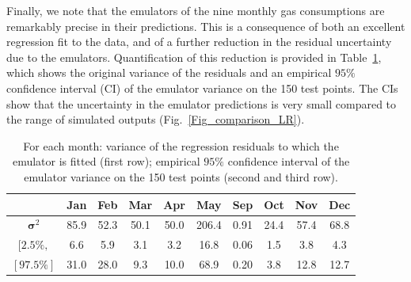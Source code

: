 \documentclass[preprint,12pt, sort&compress]{elsarticle}
\newcommand{\bd}[1]{\boldsymbol{#1}}
\begin{document}
Finally, we note that the emulators of the nine monthly gas consumptions are remarkably precise in their predictions. This is a consequence of both an excellent regression fit to the data, and of a further reduction in the residual uncertainty due to the emulators. Quantification of this reduction is provided in Table~\ref{Table_variance}, which shows the original variance of the residuals and an empirical $95\%$ confidence interval (CI) of the emulator variance on the 150 test points. The CIs show that the uncertainty in the emulator predictions is very small compared to the range of simulated outputs (Fig.~\ref{Fig_comparison_LR}). 


\begin{table}
\centering
\renewcommand{\arraystretch}{2}
\setlength{\tabcolsep}{1.5ex}
\caption{For each month: variance of the regression residuals to which the emulator is fitted (first row); empirical $95\%$ confidence interval of the emulator variance on the 150 test points (second and third row).}
\label{Table_variance}
\begin{tabular}{*{10}c}
\toprule
                   & \bf Jan & \bf Feb & \bf Mar & \bf Apr & \bf May & \bf Sep & \bf Oct & \bf Nov & \bf Dec \\
\midrule
$\bd \sigma^2$   & 85.9 & 52.3 & 50.1 & 50.0 & 206.4 & 0.91 & 24.4 & 57.4 & 68.8 \\
$\bd{[2.5\%,}$    &  6.6  &  5.9  &   3.1  &  3.2  &  16.8   & 0.06 &  1.5  &   3.8  &  4.3  \\
$\bd{[97.5\%]}$ & 31.0 & 28.0&   9.3  & 10.0 &  68.9   & 0.20 &  3.8  & 12.8 & 12.7 \\
 \bottomrule
\end{tabular}
\end{table}
\end{document}
